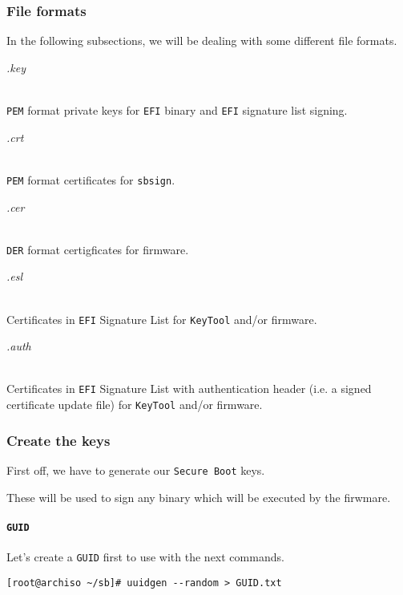 \documentclass[9pt]{report}
\newenvironment{sidebar}[2]
{\begin{tcolorbox}
        \begin{bf}
            #1
        \end{bf}
    \\#2}
{\end{tcolorbox}}
\begin{document}
\newpage

\hypertarget{x-file-formats}{\subsubsection{File formats}}
In the following subsections, we will be dealing with some different file formats.


\begin{sidebar}{\textit{.key}}
    \texttt{PEM} format private keys for \texttt{EFI} binary and \texttt{EFI} signature list signing.
\end{sidebar}

\begin{sidebar}{\textit{.crt}}
    \texttt{PEM} format certificates for \texttt{sbsign}.
\end{sidebar}

\begin{sidebar}{\textit{.cer}}
    \texttt{DER} format certigficates for firmware.
\end{sidebar}

\begin{sidebar}{\textit{.esl}}
    Certificates in \texttt{EFI} Signature List for \texttt{KeyTool} and/or firmware.
\end{sidebar}

\begin{sidebar}{\textit{.auth}}
    Certificates in \texttt{EFI} Signature List with authentication header (i.e. a signed certificate update file) for \texttt{KeyTool} and/or firmware.
\end{sidebar}

\newpage

\hypertarget{x-create-the-keys}{\subsubsection{Create the keys}}

First off, we have to generate our \texttt{Secure Boot} keys.

These will be used to sign any binary which will be executed by the firwmare.

\newpage

\hypertarget{x-guid}{\paragraph{\texttt{GUID}}}
Let’s create a \texttt{GUID} first to use with the next commands.


\begin{verbatim}
[root@archiso ~/sb]# uuidgen --random > GUID.txt
\end{verbatim}
\end{document}
